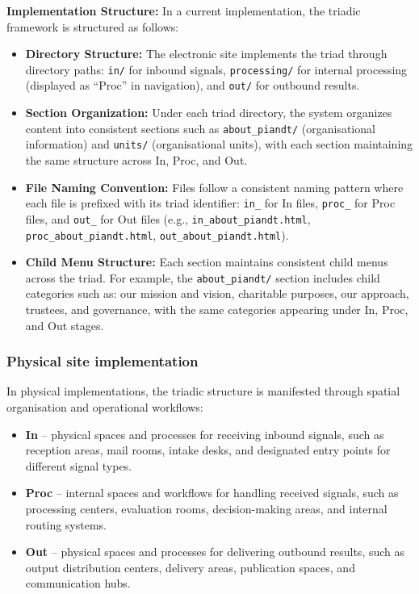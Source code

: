 \documentclass[11pt,a4paper]{article}
\begin{document}
\textbf{Implementation Structure:} In a current implementation, the triadic framework is structured as follows:
\begin{itemize}[noitemsep]
  \item \textbf{Directory Structure:} The electronic site implements the triad through directory paths: \texttt{in/} for inbound signals, \texttt{processing/} for internal processing (displayed as ``Proc'' in navigation), and \texttt{out/} for outbound results.
  \item \textbf{Section Organization:} Under each triad directory, the system organizes content into consistent sections such as \texttt{about\_piandt/} (organisational information) and \texttt{units/} (organisational units), with each section maintaining the same structure across In, Proc, and Out.
  \item \textbf{File Naming Convention:} Files follow a consistent naming pattern where each file is prefixed with its triad identifier: \texttt{in\_} for In files, \texttt{proc\_} for Proc files, and \texttt{out\_} for Out files (e.g., \texttt{in\_about\_piandt.html}, \texttt{proc\_about\_piandt.html}, \texttt{out\_about\_piandt.html}).
  \item \textbf{Child Menu Structure:} Each section maintains consistent child menus across the triad. For example, the \texttt{about\_piandt/} section includes child categories such as: our mission and vision, charitable purposes, our approach, trustees, and governance, with the same categories appearing under In, Proc, and Out stages.
\end{itemize}

\subsubsection*{Physical site implementation}

In physical implementations, the triadic structure is manifested through spatial organisation and operational workflows:
\begin{itemize}[noitemsep]
  \item \textbf{In} -- physical spaces and processes for receiving inbound signals, such as reception areas, mail rooms, intake desks, and designated entry points for different signal types.
  \item \textbf{Proc} -- internal spaces and workflows for handling received signals, such as processing centers, evaluation rooms, decision-making areas, and internal routing systems.
  \item \textbf{Out} -- physical spaces and processes for delivering outbound results, such as output distribution centers, delivery areas, publication spaces, and communication hubs.
\end{itemize}
\end{document}
